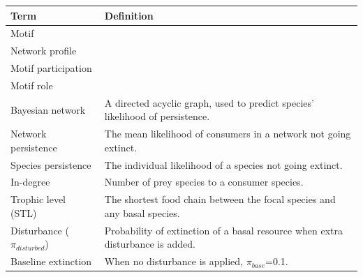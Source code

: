 \documentclass[12pt]{article}
\begin{document}
\begin{spacing}{2.0}
\begin{table}[h!]
\begin{tabular}{l|l}
    Term & Definition \\
    \hline
    Motif &  \\
    Network profile & \\
    Motif participation & \\
    Motif role & \\
    Bayesian network & A directed acyclic graph, used to predict species' likelihood of persistence. \\
    Network persistence & The mean likelihood of consumers in a network not going extinct.\\
    Species persistence & The individual likelihood of a species not going extinct.\\
    In-degree & Number of prey species to a consumer species.\\
    Trophic level (STL) & The shortest food chain between the focal species and any basal species.\\
    Disturbance ($\pi_{disturbed}$) & Probability of extinction of a basal resource when extra disturbance is added. \\
    Baseline extinction &  When no disturbance is applied, $\pi_{base}$=0.1.\\
\end{tabular}
\end{table}



 

\end{spacing}
\end{document}

